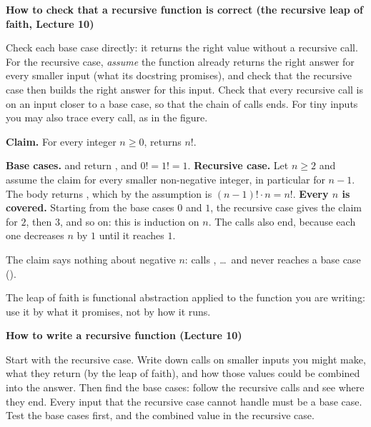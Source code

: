 \documentclass[10pt]{scrartcl}
\newenvironment{howto}[1]{\begin{mdframed}[style=howtostyle]{\color{NavyBlue}\textbf{#1}}\par\vspace{2pt}}{\end{mdframed}}
\begin{document}
\begin{howto}{How to check that a recursive function is correct (the recursive leap of faith, Lecture 10)}
\begin{steps}
  \ii Check each base case directly: it returns the right value without a recursive call.
  \ii For the recursive case, \emph{assume} the function already returns the right answer for every smaller input (what its docstring promises), and check that the recursive case then builds the right answer for this input.
  \ii Check that every recursive call is on an input closer to a base case, so that the chain of calls ends.
  \ii For tiny inputs you may also trace every call, as in the figure.
\end{steps}
\end{howto}

\begin{example*}
\textbf{Claim.} For every integer $n\ge0$,  returns $n!$.
\begin{steps}
  \ii \textbf{Base cases.}  and  return , and $0! = 1! = 1$.
  \ii \textbf{Recursive case.} Let $n\ge2$ and assume the claim for every smaller non-negative integer, in particular for $n-1$. The body returns , which by the assumption is $(n-1)!\cdot n = n!$.
  \ii \textbf{Every $n$ is covered.} Starting from the base cases $0$ and $1$, the recursive case gives the claim for $2$, then $3$, and so on: this is induction on $n$. The calls also end, because each one decreases $n$ by $1$ until it reaches $1$.
\end{steps}
The claim says nothing about negative $n$:  calls , \dots\ and never reaches a base case ().
\end{example*}
The leap of faith is functional abstraction applied to the function you are writing: use it by what it promises, not by how it runs.

\begin{howto}{How to write a recursive function (Lecture 10)}
\begin{steps}
  \ii Start with the recursive case. Write down calls on smaller inputs you might make, what they return (by the leap of faith), and how those values could be combined into the answer.
  \ii Then find the base cases: follow the recursive calls and see where they end. Every input that the recursive case cannot handle must be a base case.
  \ii Test the base cases first, and  the combined value in the recursive case.
\end{steps}
\end{howto}
\end{document}
